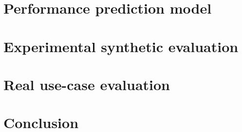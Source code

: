 \documentclass[5p]{elsarticle}
\begin{document}
\section{Performance prediction model}
\label{sec:perf_model}


\section{Experimental synthetic evaluation}
\label{sec:evaluations}


\section{Real use-case evaluation}
\label{sec:use-cases}


\section{Conclusion}
\label{sec:conc}






%  

\end{document}
